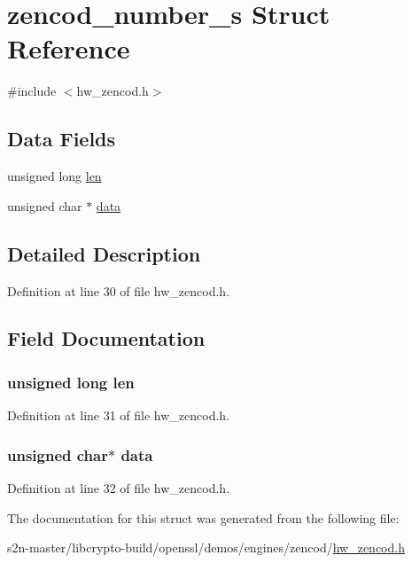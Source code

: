 \hypertarget{structzencod__number__s}{}\section{zencod\+\_\+number\+\_\+s Struct Reference}
\label{structzencod__number__s}


{\ttfamily \#include $<$hw\+\_\+zencod.\+h$>$}

\subsection*{Data Fields}
\begin{DoxyCompactItemize}
\item 
unsigned long \hyperlink{structzencod__number__s_af2e72f8a5bf4bcdb77566c2936d5f13d}{len}
\item 
unsigned char $\ast$ \hyperlink{structzencod__number__s_ac24cea2bfcc927fd29bc74d1086707d8}{data}
\end{DoxyCompactItemize}


\subsection{Detailed Description}


Definition at line 30 of file hw\+\_\+zencod.\+h.



\subsection{Field Documentation}
\subsubsection[{\texorpdfstring{len}{len}}]{\setlength{\rightskip}{0pt plus 5cm}unsigned long len}\hypertarget{structzencod__number__s_af2e72f8a5bf4bcdb77566c2936d5f13d}{}\label{structzencod__number__s_af2e72f8a5bf4bcdb77566c2936d5f13d}


Definition at line 31 of file hw\+\_\+zencod.\+h.

\subsubsection[{\texorpdfstring{data}{data}}]{\setlength{\rightskip}{0pt plus 5cm}unsigned char$\ast$ data}\hypertarget{structzencod__number__s_ac24cea2bfcc927fd29bc74d1086707d8}{}\label{structzencod__number__s_ac24cea2bfcc927fd29bc74d1086707d8}


Definition at line 32 of file hw\+\_\+zencod.\+h.



The documentation for this struct was generated from the following file\+:\begin{DoxyCompactItemize}
\item 
s2n-\/master/libcrypto-\/build/openssl/demos/engines/zencod/\hyperlink{hw__zencod_8h}{hw\+\_\+zencod.\+h}\end{DoxyCompactItemize}
